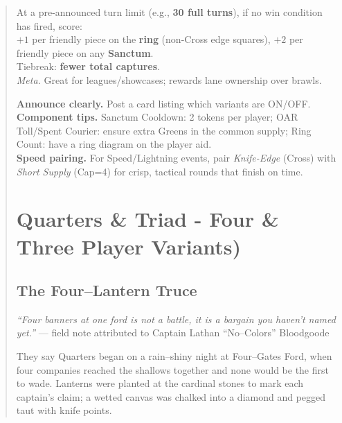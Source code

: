 \documentclass[11pt]{article}
\begin{document}
\begin{quote}
\begin{rulevariant}[title={Ring Count (Timed Scoring Ending)}]
At a pre-announced turn limit (e.g., \textbf{30 full turns}), if no win condition has fired, score:\\
\quad\(+1\) per friendly piece on the \textbf{ring} (non-Cross edge squares), \quad \(+2\) per friendly piece on any \textbf{Sanctum}.\\
Tiebreak: \textbf{fewer total captures}.\\
\textit{Meta.} Great for leagues/showcases; rewards lane ownership over brawls.
\end{rulevariant}

\medskip
\begin{tcolorbox}[enhanced,breakable,colback=white,colframe=royal,boxrule=0.8pt,title={Director’s Notes}]
\small
\textbf{Announce clearly.} Post a card listing which variants are ON/OFF. \\
\textbf{Component tips.} Sanctum Cooldown: 2 tokens per player; OAR Toll/Spent Courier: ensure extra Greens in the common supply; Ring Count: have a ring diagram on the player aid. \\
\textbf{Speed pairing.} For Speed/Lightning events, pair \emph{Knife-Edge} (Cross) with \emph{Short Supply} (Cap=4) for crisp, tactical rounds that finish on time.
\end{tcolorbox}

\clearpage

\section{Quarters \& Triad - Four \& Three Player Variants)}
\label{sec:quarters}

\subsection*{The Four–Lantern Truce}
\begin{tcolorbox}[enhanced,breakable,
  colback=royal!3, colframe=royal!70!black, boxrule=0.6pt,
  left=6pt, right=6pt, top=6pt, bottom=6pt]
\small
\textit{“Four banners at one ford is not a battle, it is a bargain you haven’t named yet.”} — field note attributed to Captain Lathan “No–Colors” Bloodgoode

\medskip
They say Quarters began on a rain–shiny night at Four–Gates Ford, when four companies reached the shallows together and none would be the first to wade. Lanterns were planted at the cardinal stones to mark each captain’s claim; a wetted canvas was chalked into a diamond and pegged taut with knife points. 


\end{tcolorbox}
\end{quote}
\end{document}

